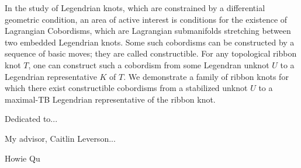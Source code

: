 \documentclass[11pt,twoside,reqno]{book}
\begin{document}

\abstr


In the study of Legendrian knots, which are constrained by a differential geometric condition, an area of active interest is conditions for the existence of Lagrangian Cobordisms, which are Lagrangian submanifolds stretching between two embedded Legendrian knots.
Some such cobordisms can be constructed by a sequence of basic moves; they are called constructible.
For any topological ribbon knot $T$, one can construct such a cobordism from some Legendran unknot $U$ to a Legendrian representative $K$ of $T$.
We demonstrate a family of ribbon knots for which there exist constructible cobordisms from a stabilized unknot $U$ to a maximal-TB Legendrian representative of the ribbon knot.

\dedic

Dedicated to...

\acknowl

My advisor, Caitlin Leverson...

Howie Qu

\tableofcontents

\startmain

%







\begin{appendices}

    

\end{appendices}

\printbibliography[heading=bibintoc]
\end{document}
